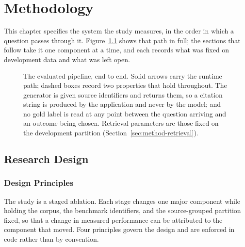 \chapter{Methodology}
\label{chap:method}


\noindent
This chapter specifies the system the study measures, in the order in which a
question passes through it. Figure~\ref{fig:pipeline} shows that path in full;
the sections that follow take it one component at a time, and each records what
was fixed on development data and what was left open.

\begin{figure}[p]
  \centering
  \resizebox{\textwidth}{!}{}
  \caption[The evaluated pipeline, end to end]{The evaluated pipeline, end to
  end. Solid arrows carry the runtime path; dashed boxes record two properties
  that hold throughout. The generator is given source identifiers and returns
  them, so a citation string is produced by the application and never by the
  model; and no gold label is read at any point between the question arriving
  and an outcome being chosen. Retrieval parameters are those fixed on the
  development partition (Section~\ref{sec:method-retrieval}).}
  \label{fig:pipeline}
\end{figure}

\section{Research Design}
\label{sec:method-design}

\subsection{Design Principles}

The study is a staged ablation. Each stage changes one major component while holding the corpus, the benchmark identifiers, and the source-grouped partition fixed, so that a change in measured performance can be attributed to the component that moved. Four principles govern the design and are enforced in code rather than by convention.

